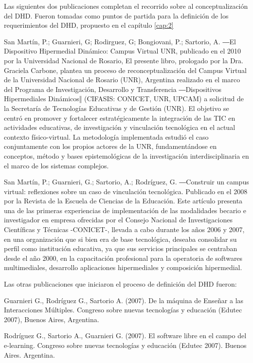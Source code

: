 {Las siguientes dos publicaciones completan el recorrido sobre al
conceptualización del DHD. Fueron tomadas como puntos de partida
para la definición de los requerimientos del DHD, propuesto en el capítulo
\ref{cap:2} 


San Martín, P.; Guarnieri, G; Rodirguez, G; Bongiovani, P.; Sartorio, A. ―El
Dispositivo Hipermedial Dinámico: Campus Virtual UNR, publicado en el 2010 por
la Universidad Nacional de Rosario, El presente libro, prologado por la Dra.
Graciela Carbone, plantea un proceso de reconceptualización del Campus Virtual
de la Universidad Nacional de Rosario (UNR), Argentina realizado en el marco del
Programa de Investigación, Desarrollo y Transferencia ―Dispositivos
Hipermediales Dinámicos‖ (CIFASIS: CONICET, UNR, UPCAM) a solicitud de la
Secretaría de Tecnologías Educativas y de Gestión (UNR). El objetivo se centró
en promover y fortalecer estratégicamente la integración de las TIC
en actividades educativas, de investigación y vinculación tecnológica en el
actual contexto físico-virtual. La metodología implementada estudió el caso
conjuntamente con los propios actores de la UNR, fundamentándose en conceptos,
método y bases epistemológicas de la investigación interdisciplinaria en el
marco de los sistemas complejos.

San Martín, P.; Guarnieri, G.; Sartorio, A.; Rodríguez, G. ―Construir un campus
virtual: reflexiones sobre un caso de vinculación tecnológica. Publicado en el
2008 por la Revista de la Escuela de Ciencias de la Educación. Este artículo
presenta una de las primeras experiencias de implementación de las modalidades
becario e investigador en empresa ofrecidas por el Consejo Nacional de
Investigaciones Científicas y Técnicas -CONICET-, llevada a cabo durante los
años 2006 y 2007, en una organización que si bien era de base tecnológica,
deseaba consolidar su perfil como institución educativa, ya que sus servicios
principales se centraban desde el año 2000, en la capacitación profesional para
la operatoria de softwares multimediales, desarrollo aplicaciones hipermediales
y composición hipermedial.


Las otras publicaciones que iniciaron el proceso de definición del DHD fueron:

Guarnieri G., Rodríguez G., Sartorio A. (2007). De la máquina de Enseñar
a las Interacciones Múltiples. Congreso sobre nuevas tecnologías y educación
(Edutec 2007), Buenos Aires, Argentina.

Rodríguez G., Sartorio A., Guarnieri G. (2007). El software libre en el
campo del e-learning. Congreso sobre nuevas tecnologías y educación (Edutec
2007). Buenos Aires. Argentina.

}
